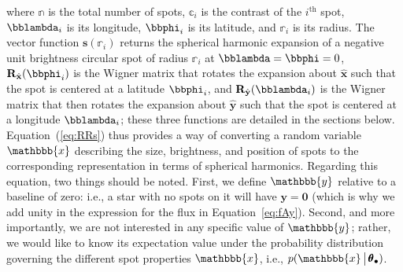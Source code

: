 \documentclass[modern,linenumbers]{aastex62}
\begin{document}
%
where $\mathbb{n}$ is the total number of spots,
$\mathbb{c}_i$ is the contrast of the $i^\mathrm{th}$ spot,
$\bblambda_i$ is its longitude, $\bbphi_i$ is its latitude,
and $\mathbb{r}_i$ is its radius.
The vector function $\mathbf{s}(\mathbb{r}_i)$
returns the spherical harmonic expansion of a negative unit brightness
circular spot of radius $\mathbb{r}_i$ at $\bblambda = \bbphi = 0$,
$\mathbf{R}_{\hat{\mathbf{x}}}(\bbphi_i)$ is the Wigner matrix that rotates the
expansion about $\hat{\mathbf{x}}$ such that the spot is centered at a
latitude $\bbphi_i$, and $\mathbf{R}_{\hat{\mathbf{y}}}(\bblambda_i)$ is the Wigner
matrix that then rotates the
expansion about $\hat{\mathbf{y}}$ such that the spot is centered at a
longitude $\bblambda_i$; these three functions are detailed in the sections below.
%
Equation~(\ref{eq:RRs}) thus provides a way of converting a random variable
$\mathbbb{x}$ describing the size, brightness, and position of spots to the
corresponding representation in terms of spherical harmonics.
%
Regarding this equation,
two things should be noted. First, we define $\mathbbb{y}$ relative to
a baseline of zero: i.e., a star with no spots on it will have
$\mathbf{y} = \mathbf{0}$ (which is why we add unity in the expression for the flux
in Equation~\ref{eq:fAy}). Second, and more importantly,
we are not interested in any specific value of
$\mathbbb{y}$; rather, we would like to know its expectation value under
the probability distribution governing the different spot properties $\mathbbb{x}$,
i.e., $p(\mathbbb{x} \, \big| \, \pmb{\theta}_\bullet)$.
%
\end{document}
